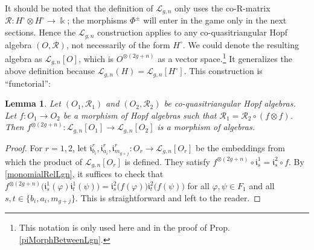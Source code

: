 \documentclass[11pt]{amsart}
\newtheorem{lem}[teo]{Lemma}
\begin{document}
\smallskip

\indent It should be noted that the definition of $\mathcal{L}_{g,n}$ only uses the co-R-matrix $\mathcal{R} : H^\circ \otimes H^\circ \to \Bbbk$; the morphisms $\Phi^\pm$ will enter in the game only in the next sections. Hence the $\mathcal{L}_{g,n}$ construction applies to any co-quasitriangular Hopf algebra $(O,\mathcal{R})$, not necessarily of the form $H^\circ$. We could denote the resulting algebra as $\mathcal{L}_{g,n}[O]$, which is $O^{\otimes (2g+n)}$ as a vector space.\footnote{This notation is only used here and in the proof of Prop.\,\ref{piMorphBetweenLgn}.} It generalizes the above definition because $\mathcal{L}_{g,n}(H) = \mathcal{L}_{g,n}[H^\circ]$. This construction is ``functorial'':

\begin{lem}\label{lemmaLgnIsFunctorial}
Let $(O_1,\mathcal{R}_1)$ and $(O_2, \mathcal{R}_2)$ be co-quasitriangular Hopf algebras. Let $f : O_1 \to O_2$ be a morphism of Hopf algebras such that $\mathcal{R}_1 = \mathcal{R}_2 \circ (f \otimes f)$. Then $f^{\otimes (2g+n)} : \mathcal{L}_{g,n}[O_1] \to \mathcal{L}_{g,n}[O_2]$ is a morphism of algebras.
\end{lem}
\begin{proof}
For $r=1,2$, let $\mathfrak{i}_{b_i}^r, \mathfrak{i}_{a_i}^r, \mathfrak{i}_{m_{g+j}}^r : O_r \to \mathcal{L}_{g,n}[O_r]$ be the embeddings from which the product of $\mathcal{L}_{g,n}[O_r]$ is defined. They satisfy $f^{\otimes (2g+n)} \circ \mathfrak{i}^1_s = \mathfrak{i}^2_s \circ f$. By \eqref{monomialRelLgn}, it suffices to check that $f^{\otimes (2g+n)}\bigl( \mathfrak{i}^1_s(\varphi)\mathfrak{i}^1_t(\psi) \bigr) = \mathfrak{i}^2_s\bigl( f(\varphi)\bigr) \mathfrak{i}^2_t\bigl(f(\psi) \bigr)$ for all $\varphi,\psi \in F_1$ and all $s,t \in \{b_i,a_i,m_{g+j} \}$. This is straightforward and left to the reader.
\end{proof}
\end{document}
